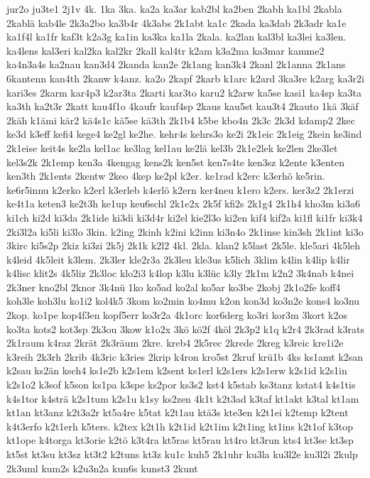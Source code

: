 {jur2o
ju3te1
2j1v
4k.
1ka
3ka.
ka2a
ka3ar
kab2bl
ka2ben
2kabh
ka1bl
2kabla
2kablä
kab4le
2k3a2bo
ka3b4r
4k3abs
2k1abt
ka1c
2kada
ka3dab
2k3adr
ka1e
ka1f4l
ka1fr
kaf3t
k2a3g
ka1in
ka3ka
ka1la
2kala.
ka2lan
kal3bl
ka3lei
ka3len.
ka4lens
kal3eri
kal2ka
kal2kr
2kall
kal4tr
k2am
k3a2ma
ka3mar
kamme2
ka4n3a4s
ka2nau
kan3d4
2kanda
kan2e
2k1ang
kan3k4
2kanl
2k1anna
2k1ans
6kantenn
kan4th
2kanw
k4anz.
ka2o
2kapf
2karb
k1arc
k2ard
3ka3re
k2arg
ka3r2i
kari3es
2karm
kar4p3
k2ar3ta
2karti
kar3to
karu2
k2arw
ka5se
kasi1
ka4sp
ka3ta
ka3th
ka2t3r
2katt
kau4f1o
4kaufr
kauf4sp
2kaus
kau5st
kau3t4
2kauto
1kä
3käf
2käh
k1ämi
kär2
kä4s1c
kä5se
kä3th
2k1b4
k5be
kbo4n
2k3c
2k3d
kdamp2
2kec
ke3d
k3eff
kefi4
kege4
ke2gl
ke2he.
kehr4s
kehrs3o
ke2i
2k1eic
2k1eig
2kein
ke3ind
2k1eise
keit4s
ke2la
kel1ac
ke3lag
kel1au
ke2lä
kel3b
2k1e2lek
ke2len
2ke3let
kel3s2k
2k1emp
ken3a
4kengag
kens2k
ken5st
ken7s4te
ken3sz
k2ente
k3enten
ken3th
2k1ents
2kentw
2keo
4kep
ke2pl
k2er.
ke1rad
k2erc
k3erhö
ke5rin.
ke6r5innu
k2erko
k2erl
k3erleb
k4erlö
k2ern
ker4neu
k1ero
k2ers.
ker3z2
2k1erzi
ke4t1a
keten3
ke2t3h
ke1up
keu6schl
2k1e2x
2k5f
kfi2s
2k1g4
2k1h4
kho3m
ki3a6
ki1ch
ki2d
ki3da
2k1ide
ki3di
ki3d4r
ki2el
kie2l3o
ki2en
kif4
kif2a
ki1fl
ki1fr
ki3k4
2ki3l2a
ki5li
ki3lo
3kin.
k2ing
2kinh
k2ini
k2inn
ki3n4o
2k1inse
kin3sh
2k1int
ki3o
3kirc
ki5s2p
2kiz
ki3zi
2k5j
2k1k
k2l2
4kl.
2kla.
klan2
k5last
2k5le.
kle5ari
4k5leh
k4leid
4k5leit
k3lem.
2k3ler
kle2r3a
2k3leu
kle3us
k5lich
3klim
k4lin
k4lip
k4lir
k4lisc
klit2s
4k5liz
2k3loc
klo2i3
k4lop
k3lu
k3lüc
k3ly
2k1m
k2n2
3k4nab
k4nei
2k3ner
kno2bl
2knor
3k4nü
1ko
ko5ad
ko2al
ko5ar
ko3be
2kobj
2k1o2fe
koff4
koh3le
koh3lu
ko1i2
kol4k5
3kom
ko2min
ko4mu
k2on
kon3d
ko3n2e
kons4
ko3nu
2kop.
ko1pe
kop4f3en
kopf5err
ko3r2a
4k1orc
kor6derg
ko3ri
kor3m
3kort
k2os
ko3ta
kots2
kot3sp
2k3ou
3kow
k1o2x
3kö
kö2f
4köl
2k3p2
k1q
k2r4
2k3rad
k3rats
2k1raum
k4raz
2krät
2k3räum
2kre.
kreb4
2k5rec
2krede
2kreg
k3reic
kre1i2e
k3reih
2k3rh
2krib
4k3ric
k3ries
2krip
k4ron
kro5st
2kruf
krü1b
4ks
ks1amt
k2san
k2sau
ks2än
ksch4
ks1e2b
k2s1em
k2sent
ks1erl
k2s1ers
k2s1erw
k2s1id
k2s1in
k2s1o2
k3sof
k5son
ks1pa
k3spe
ks2por
ks3s2
kst4
k5stab
ks3tanz
kstat4
k4s1tis
k4s1tor
k4strä
k2s1tum
k2s1u
k1sy
ks2zen
4k1t
k2t3ad
k3taf
kt1akt
k3tal
kt1am
kt1an
kt3anz
k2t3a2r
kt5a4re
k5tat
k2t1au
ktä3s
kte3en
k2t1ei
k2temp
k2tent
k4t3erfo
k2t1erh
k5ters.
k2tex
k2t1h
k2t1id
k2t1im
k2t1ing
kt1ins
k2t1of
k3top
kt1ope
k4torga
kt3orie
k2tö
k3t4ra
kt5ras
kt5rau
kt4ro
kt3run
kts4
kt3se
kt3sp
kt5st
kt3su
kt3sz
kt3t2
k2tuns
kt3z
ku1c
kuh5
2k1uhr
ku3la
ku3l2e
ku3l2i
2kulp
2k3uml
kum2s
k2u3n2a
kun6s
kunst3
2kunt
}
